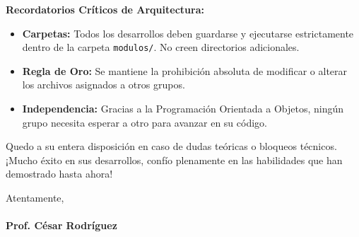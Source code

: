 \documentclass[12pt,letterpaper]{article}
\begin{document}
\vspace{0.3cm}
\noindent \textbf{Recordatorios Críticos de Arquitectura:}
\begin{itemize}
    \item \textbf{Carpetas:} Todos los desarrollos deben guardarse y ejecutarse estrictamente dentro de la carpeta \texttt{modulos/}. No creen directorios adicionales.
    \item \textbf{Regla de Oro:} Se mantiene la prohibición absoluta de modificar o alterar los archivos asignados a otros grupos.
    \item \textbf{Independencia:} Gracias a la Programación Orientada a Objetos, ningún grupo necesita esperar a otro para avanzar en su código.
\end{itemize}

Quedo a su entera disposición en caso de dudas teóricas o bloqueos técnicos. ¡Mucho éxito en sus desarrollos, confío plenamente en las habilidades que han demostrado hasta ahora!

\vspace{1cm}
\noindent Atentamente, \\
\vspace{0.5cm} \\
\textbf{Prof. César Rodríguez}
\end{document}

